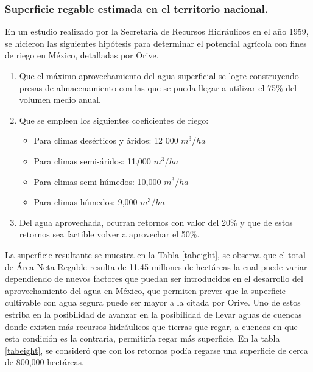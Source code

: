 \subsubsection{Superficie regable estimada en el territorio nacional.}
En un estudio realizado por la Secretaria de Recursos Hidráulicos en el año 1959, se hicieron las siguientes hipótesis para determinar el potencial agrícola con fines de riego en México, detalladas por Orive.
\begin{enumerate}
	\item Que el máximo aprovechamiento del agua superficial se logre construyendo presas de almacenamiento con las que se pueda llegar a utilizar el 75\% del volumen medio anual.
	\item Que se empleen los siguientes coeficientes de riego:
	      \begin{itemize}
		      \item Para climas desérticos y áridos: 12 000 $m^3/ha$
		      \item Para climas semi-áridos: 11,000 $m^3/ha$
		      \item Para climas semi-húmedos: 10,000 $m^3/ha$
		      \item Para climas húmedos: 9,000 $m^3/ha$
	      \end{itemize}
	\item Del agua aprovechada, ocurran retornos con valor del 20\% y que de estos retornos sea factible volver a aprovechar el 50\%.
\end{enumerate}
La superficie resultante se muestra en la Tabla \ref{tabeight}, se observa que el total de Área Neta Regable resulta de 11.45 millones de hectáreas la cual puede variar dependiendo de nuevos factores que puedan ser introducidos en el desarrollo del aprovechamiento del agua en México, que permiten prever que la superficie cultivable con agua segura puede ser mayor a la citada por Orive. Uno de estos estriba en la posibilidad de avanzar en la posibilidad de llevar aguas de cuencas donde existen más recursos hidráulicos que tierras que regar, a cuencas en que esta condición es la contraria, permitiría regar más superficie. En la tabla \ref{tabeight}, se consideró que con los retornos podía regarse una superficie de cerca de 800,000 hectáreas.
